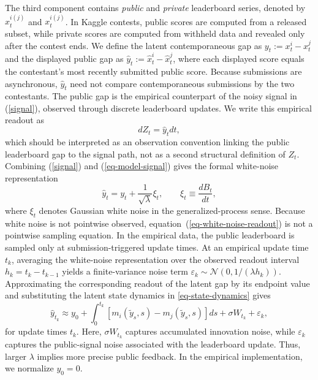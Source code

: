 \documentclass[mnsc]{informs3}
\begin{document}
The third component contains \textit{public} and \textit{private} leaderboard series, denoted by $\hat{x}^{i(j)}_t$ and $x^{i(j)}_t$.
In Kaggle contests, public scores are computed from a released subset, while private scores are computed from withheld data and revealed only after the contest ends.
We define the latent contemporaneous gap as $y_t:=x_t^i-x_t^j$ and the displayed public gap as $\hat y_t:=\hat x_t^i-\hat x_t^j$, where each displayed score equals the contestant's most recently submitted public score. Because submissions are asynchronous, $\hat y_t$ need not compare contemporaneous submissions by the two contestants.
The public gap is the empirical counterpart of the noisy signal in (\ref{signal}), observed through discrete leaderboard updates.
We write this empirical readout as
\begin{equation}\label{eq-model-signal}
dZ_t = \hat y_tdt,
\end{equation}
which should be interpreted as an observation convention linking the public leaderboard gap to the signal path, not as a second structural definition of $Z_t$.
Combining (\ref{signal}) and (\ref{eq-model-signal}) gives the formal white-noise representation
\begin{equation}\label{eq-white-noise-readout}
\hat y_t = y_t+\frac{1}{\sqrt{\lambda}}\xi_t,\qquad \xi_t\equiv \frac{dB_t}{dt},
\end{equation}
where $\xi_t$ denotes Gaussian white noise in the generalized-process sense.
Because white noise is not pointwise observed, equation~(\ref{eq-white-noise-readout}) is not a pointwise sampling equation.
In the empirical data, the public leaderboard is sampled only at submission-triggered update times.
At an empirical update time $t_k$, averaging the white-noise representation over the observed readout interval $h_k=t_k-t_{k-1}$ yields a finite-variance noise term $\varepsilon_k\sim\mathcal{N}(0,1/(\lambda h_k))$.
Approximating the corresponding readout of the latent gap by its endpoint value and substituting the latent state dynamics in \eqref{eq-state-dynamics} gives
\begin{equation}\label{eq-leaderboard-gap}
\hat y_{t_k}
\approx
y_0+\int_0^{t_k}\left[m_i(\tilde{y}_s,s)-m_j(\tilde{y}_s,s)\right]ds
+\sigma W_{t_k}
+\varepsilon_k,
\end{equation}
for update times $t_k$.
Here, $\sigma W_{t_k}$ captures accumulated innovation noise, while $\varepsilon_k$ captures the public-signal noise associated with the leaderboard update.
Thus, larger $\lambda$ implies more precise public feedback.
In the empirical implementation, we normalize $y_0=0$.
\end{document}
